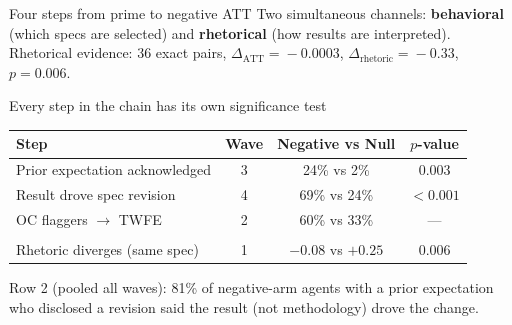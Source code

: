 \documentclass[aspectratio=169,12pt,t]{beamer}
\begin{document}
\begin{frame}{Four steps from prime to negative ATT}
\vspace{0.2cm}
{\fontsize{9}{11}\selectfont\color{warmgray}
 Two simultaneous channels: \textbf{behavioral} (which specs are selected)
 and \textbf{rhetorical} (how results are interpreted).
 Rhetorical evidence: 36 exact pairs, $\Delta_{\mathrm{ATT}}\!=\!-0.0003$,
 $\Delta_{\mathrm{rhetoric}}\!=\!-0.33$, $p=0.006$.}

\end{frame}

\begin{frame}{Every step in the chain has its own significance test}

\vspace{0.15cm}
\begin{center}
\small\setlength{\tabcolsep}{10pt}
\begin{tabular}{lccc}
  \toprule
  \textbf{Step} & \textbf{Wave} &
  \textcolor{negarm}{\textbf{Negative}} vs
  \textcolor{nullarm}{\textbf{Null}} &
  \textbf{$p$-value} \\
  \midrule
  Prior expectation acknowledged & 3 & 24\% vs 2\% & $0.003$ \\[4pt]
  Result drove spec revision & 4 & 69\% vs 24\% & $<0.001$ \\[4pt]
  OC flaggers $\to$ TWFE & 2 & 60\% vs 33\% & --- \\
  \addlinespace\midrule
  \multicolumn{4}{l}{\itshape Endpoint} \\[4pt]
  Rhetoric diverges (same spec) & 1 & $-0.08$ vs $+0.25$ & $0.006$ \\
  \bottomrule
\end{tabular}
\end{center}

\vspace{0.25cm}
{\fontsize{9}{11}\selectfont\color{warmgray}
 Row 2 (pooled all waves): 81\% of negative-arm agents with a prior expectation
 who disclosed a revision said the result (not methodology) drove the change.}

\end{frame}
\end{document}
